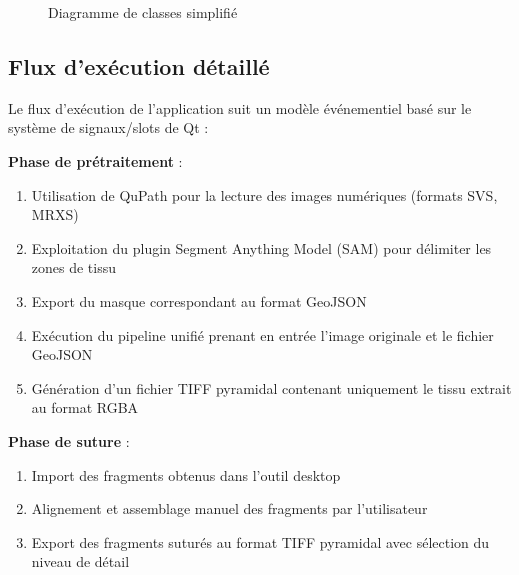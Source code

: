 \documentclass[12pt,a4paper]{report}
\begin{document}
\begin{figure}[H]
\caption{Diagramme de classes simplifié}
\label{fig:diagramme_classes}
\end{figure}

\subsection{Flux d'exécution détaillé}

Le flux d'exécution de l'application suit un modèle événementiel basé sur le système de signaux/slots de Qt :

\textbf{Phase de prétraitement} :
\begin{enumerate}
\item Utilisation de QuPath pour la lecture des images numériques (formats SVS, MRXS)
\item Exploitation du plugin Segment Anything Model (SAM) pour délimiter les zones de tissu
\item Export du masque correspondant au format GeoJSON
\item Exécution du pipeline unifié prenant en entrée l'image originale et le fichier GeoJSON
\item Génération d'un fichier TIFF pyramidal contenant uniquement le tissu extrait au format RGBA
\end{enumerate}

\textbf{Phase de suture} :
\begin{enumerate}
\item Import des fragments obtenus dans l'outil desktop
\item Alignement et assemblage manuel des fragments par l'utilisateur
\item Export des fragments suturés au format TIFF pyramidal avec sélection du niveau de détail
\end{enumerate}
\end{document}
